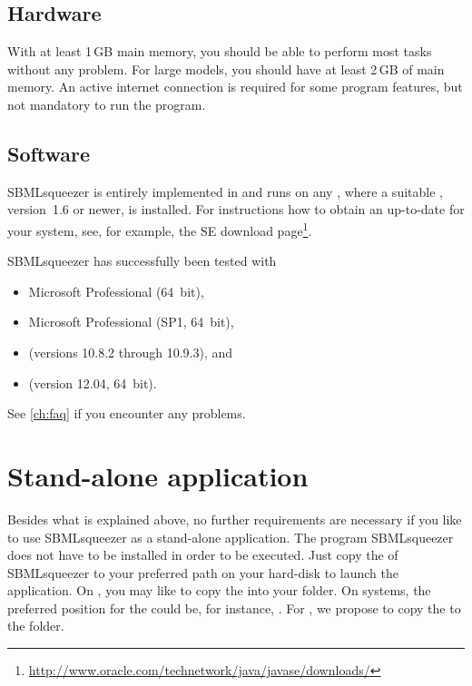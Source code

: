 \subsection{Hardware}

With at least 1\,GB main memory, you should be able to perform most tasks without any problem. For large models, you should have at least 2\,GB of main memory.
An active internet connection is required for some program features, but not mandatory to run the program. %

\subsection{Software}\label{sec:SoftwareRequirements}

SBMLsqueezer is entirely implemented in \Java and runs on any \OS, where a 
suitable \JVM, \JDK version~1.6 or newer, is installed.
For instructions how to obtain an up-to-date \JVM for your system, see, for 
example, the \Java SE download
page\footnote{\url{http://www.oracle.com/technetwork/java/javase/downloads/}\label{fn:jvmldl}}.

SBMLsqueezer has successfully been tested with
\begin{itemize}
  \item Microsoft \WindowsSeven Professional (64~bit),
  \item Microsoft \WindowsSeven Professional (SP1, 64~bit),
  \item \MacOSX (versions 10.8.2 through 10.9.3), and
  \item \UbuntuLinux (version 12.04, 64~bit).
\end{itemize}
See \vref{ch:faq} if you encounter any problems.

\section{Stand-alone application}
\label{sec:StandAlone}

Besides what is explained above, no further requirements are necessary if you
like to use SBMLsqueezer as a stand-alone application.
The program SBMLsqueezer does not have to be installed in order to be executed.
Just copy the \JAR of SBMLsqueezer to your preferred path on your hard-disk
to launch the application.
On \MacOSX, you may like to copy the \JAR into your
folder.
On \Windows systems, the preferred position for the \JAR could be, for
instance,
.
For \Linux, we propose to copy the \JAR to the  folder.


